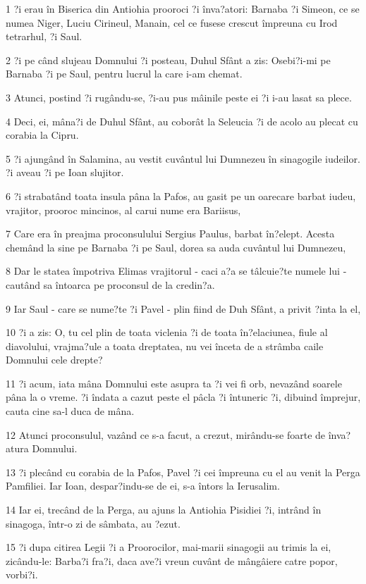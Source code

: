 \par 1 ?i erau în Biserica din Antiohia prooroci ?i înva?atori: Barnaba ?i Simeon, ce se numea Niger, Luciu Cirineul, Manain, cel ce fusese crescut împreuna cu Irod tetrarhul, ?i Saul.
\par 2 ?i pe când slujeau Domnului ?i posteau, Duhul Sfânt a zis: Osebi?i-mi pe Barnaba ?i pe Saul, pentru lucrul la care i-am chemat.
\par 3 Atunci, postind ?i rugându-se, ?i-au pus mâinile peste ei ?i i-au lasat sa plece.
\par 4 Deci, ei, mâna?i de Duhul Sfânt, au coborât la Seleucia ?i de acolo au plecat cu corabia la Cipru.
\par 5 ?i ajungând în Salamina, au vestit cuvântul lui Dumnezeu în sinagogile iudeilor. ?i aveau ?i pe Ioan slujitor.
\par 6 ?i strabatând toata insula pâna la Pafos, au gasit pe un oarecare barbat iudeu, vrajitor, prooroc mincinos, al carui nume era Bariisus,
\par 7 Care era în preajma proconsulului Sergius Paulus, barbat în?elept. Acesta chemând la sine pe Barnaba ?i pe Saul, dorea sa auda cuvântul lui Dumnezeu,
\par 8 Dar le statea împotriva Elimas vrajitorul - caci a?a se tâlcuie?te numele lui - cautând sa întoarca pe proconsul de la credin?a.
\par 9 Iar Saul - care se nume?te ?i Pavel - plin fiind de Duh Sfânt, a privit ?inta la el,
\par 10 ?i a zis: O, tu cel plin de toata viclenia ?i de toata în?elaciunea, fiule al diavolului, vrajma?ule a toata dreptatea, nu vei înceta de a strâmba caile Domnului cele drepte?
\par 11 ?i acum, iata mâna Domnului este asupra ta ?i vei fi orb, nevazând soarele pâna la o vreme. ?i îndata a cazut peste el pâcla ?i întuneric ?i, dibuind împrejur, cauta cine sa-l duca de mâna.
\par 12 Atunci proconsulul, vazând ce s-a facut, a crezut, mirându-se foarte de înva?atura Domnului.
\par 13 ?i plecând cu corabia de la Pafos, Pavel ?i cei împreuna cu el au venit la Perga Pamfiliei. Iar Ioan, despar?indu-se de ei, s-a întors la Ierusalim.
\par 14 Iar ei, trecând de la Perga, au ajuns la Antiohia Pisidiei ?i, intrând în sinagoga, într-o zi de sâmbata, au ?ezut.
\par 15 ?i dupa citirea Legii ?i a Proorocilor, mai-marii sinagogii au trimis la ei, zicându-le: Barba?i fra?i, daca ave?i vreun cuvânt de mângâiere catre popor, vorbi?i.

